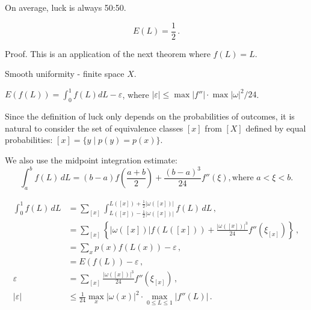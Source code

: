 \begin{theorem}{On average, luck is always 50:50.}
\label{thm:fifty}

\begin{equation*}
E(L)=\frac{1}{2} \,.
\end{equation*}

Proof.  This is an application of the next theorem where $f(L)=L$.
\end{theorem}

\begin{theorem}{Smooth uniformity - finite space $X$.}
\label{thm:smooth-uniformity}

$E(f(L))=\int_0^1 f(L) dL-\varepsilon$, where $|\varepsilon| \leq \max|f''| \cdot \max |\omega|^2 / 24$.

Since the definition of luck only depends on the probabilities of outcomes, it is natural to consider the set of equivalence classes $[x]$ from $[X]$ defined by equal probabilities: $[x]=\{y \mid p(y)=p(x) \}$.  

We also use the midpoint integration estimate:
\begin{equation*}
\int_{a}^{b} f(L) \, dL = (b-a)f(\frac{a+b}{2})+\frac{(b-a)^3}{24} f''(\xi), \text{where $a < \xi < b$.}
\end{equation*}

\begin{align}
\int_0^1 f(L) \, dL 
  &= \sum_{[x]} \int_{L([x])-\frac{1}{2}|\omega([x])|}^{L([x])+\frac{1}{2}|\omega([x])|} f(L) \, dL \,, \\
  &= \sum_{[x]} \left\{ |\omega([x])| f(L([x])) + \frac{|\omega([x])|^3}{24} f''(\xi_{[x]}) \right\} \,, \\
  &= \sum_{x} p(x) f(L(x)) - \varepsilon \,, \\
  &= E(f(L)) -\varepsilon \,, \\
\varepsilon 
\label{eq:midpointerror}
   &= \sum_{[x]} \frac{|\omega([x])|^3}{24} f''(\xi_{[x]}) \,, \\
 |\varepsilon| 
   &\leq \frac{1}{24} \max_{x} |\omega(x)|^2 \cdot \max_{0\leq L \leq 1} |f''(L)| \,.
\end{align}
\end{theorem}

